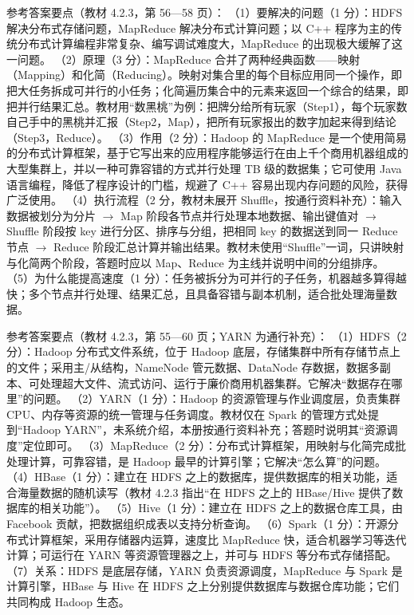 \documentclass[a4paper,11pt]{article}
\begin{document}
\q 参考答案要点（教材 4.2.3，第 56—58 页）：
（1）要解决的问题（1 分）：HDFS 解决分布式存储问题，MapReduce 解决分布式计算问题；以 C++ 程序为主的传统分布式计算编程非常复杂、编写调试难度大，MapReduce 的出现极大缓解了这一问题。
（2）原理（3 分）：MapReduce 合并了两种经典函数——映射（Mapping）和化简（Reducing）。映射对集合里的每个目标应用同一个操作，即把大任务拆成可并行的小任务；化简遍历集合中的元素来返回一个综合的结果，即把并行结果汇总。教材用“数黑桃”为例：把牌分给所有玩家（Step1），每个玩家数自己手中的黑桃并汇报（Step2，Map），把所有玩家报出的数字加起来得到结论（Step3，Reduce）。
（3）作用（2 分）：Hadoop 的 MapReduce 是一个使用简易的分布式计算框架，基于它写出来的应用程序能够运行在由上千个商用机器组成的大型集群上，并以一种可靠容错的方式并行处理 TB 级的数据集；它可使用 Java 语言编程，降低了程序设计的门槛，规避了 C++ 容易出现内存问题的风险，获得广泛使用。
（4）执行流程（2 分，教材未展开 Shuffle，按通行资料补充）：输入数据被划分为分片 $\rightarrow$ Map 阶段各节点并行处理本地数据、输出键值对 $\rightarrow$ Shuffle 阶段按 key 进行分区、排序与分组，把相同 key 的数据送到同一 Reduce 节点 $\rightarrow$ Reduce 阶段汇总计算并输出结果。教材未使用“Shuffle”一词，只讲映射与化简两个阶段，答题时应以 Map、Reduce 为主线并说明中间的分组排序。
（5）为什么能提高速度（1 分）：任务被拆分为可并行的子任务，机器越多算得越快；多个节点并行处理、结果汇总，且具备容错与副本机制，适合批处理海量数据。

\q 参考答案要点（教材 4.2.3，第 55—60 页；YARN 为通行补充）：
（1）HDFS（2 分）：Hadoop 分布式文件系统，位于 Hadoop 底层，存储集群中所有存储节点上的文件；采用主/从结构，NameNode 管元数据、DataNode 存数据，数据多副本、可处理超大文件、流式访问、运行于廉价商用机器集群。它解决“数据存在哪里”的问题。
（2）YARN（1 分）：Hadoop 的资源管理与作业调度层，负责集群 CPU、内存等资源的统一管理与任务调度。教材仅在 Spark 的管理方式处提到“Hadoop YARN”，未系统介绍，本册按通行资料补充；答题时说明其“资源调度”定位即可。
（3）MapReduce（2 分）：分布式计算框架，用映射与化简完成批处理计算，可靠容错，是 Hadoop 最早的计算引擎；它解决“怎么算”的问题。
（4）HBase（1 分）：建立在 HDFS 之上的数据库，提供数据库的相关功能，适合海量数据的随机读写（教材 4.2.3 指出“在 HDFS 之上的 HBase/Hive 提供了数据库的相关功能”）。
（5）Hive（1 分）：建立在 HDFS 之上的数据仓库工具，由 Facebook 贡献，把数据组织成表以支持分析查询。
（6）Spark（1 分）：开源分布式计算框架，采用存储器内运算，速度比 MapReduce 快，适合机器学习等迭代计算；可运行在 YARN 等资源管理器之上，并可与 HDFS 等分布式存储搭配。
（7）关系：HDFS 是底层存储，YARN 负责资源调度，MapReduce 与 Spark 是计算引擎，HBase 与 Hive 在 HDFS 之上分别提供数据库与数据仓库功能；它们共同构成 Hadoop 生态。
\end{document}
